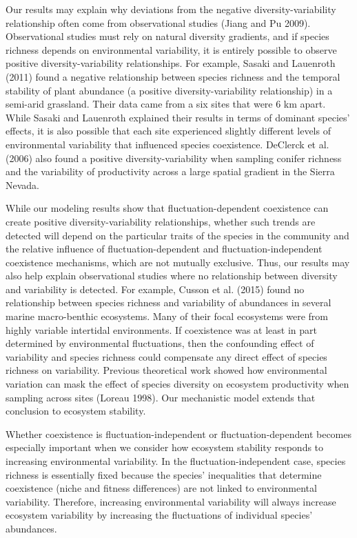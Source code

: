 \documentclass[12pt,]{article}
\begin{document}
Our results may explain why deviations from the negative
diversity-variability relationship often come from observational studies
(Jiang and Pu 2009). Observational studies must rely on natural
diversity gradients, and if species richness depends on environmental
variability, it is entirely possible to observe positive
diversity-variability relationships. For example, Sasaki and Lauenroth
(2011) found a negative relationship between species richness and the
temporal stability of plant abundance (a positive diversity-variability
relationship) in a semi-arid grassland. Their data came from a six sites
that were 6 km apart. While Sasaki and Lauenroth explained their results
in terms of dominant species' effects, it is also possible that each
site experienced slightly different levels of environmental variability
that influenced species coexistence. DeClerck et al. (2006) also found a
positive diversity-variability when sampling conifer richness and the
variability of productivity across a large spatial gradient in the
Sierra Nevada.

While our modeling results show that fluctuation-dependent coexistence
can create positive diversity-variability relationships, whether such
trends are detected will depend on the particular traits of the species
in the community and the relative influence of fluctuation-dependent and
fluctuation-independent coexistence mechanisms, which are not mutually
exclusive. Thus, our results may also help explain observational studies
where no relationship between diversity and variability is detected. For
example, Cusson et al. (2015) found no relationship between species
richness and variability of abundances in several marine macro-benthic
ecosystems. Many of their focal ecosystems were from highly variable
intertidal environments. If coexistence was at least in part determined
by environmental fluctuations, then the confounding effect of
variability and species richness could compensate any direct effect of
species richness on variability. Previous theoretical work showed how
environmental variation can mask the effect of species diversity on
ecosystem productivity when sampling across sites (Loreau 1998). Our
mechanistic model extends that conclusion to ecosystem stability.

Whether coexistence is fluctuation-independent or fluctuation-dependent
becomes especially important when we consider how ecosystem stability
responds to increasing environmental variability. In the
fluctuation-independent case, species richness is essentially fixed
because the species' inequalities that determine coexistence (niche and
fitness differences) are not linked to environmental variability.
Therefore, increasing environmental variability will always increase
ecosystem variability by increasing the fluctuations of individual
species' abundances.
\end{document}
